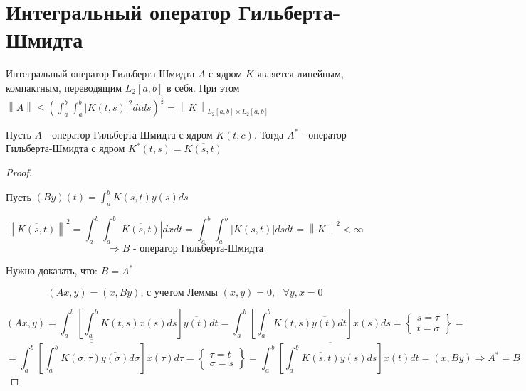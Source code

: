 \documentclass[12pt, a4paper]{report}
\begin{document}
\fi


\section{Интегральный оператор Гильберта-Шмидта}

\begin{theorem}

    Интегральный оператор Гильберта-Шмидта \( A \) с ядром \( K \) является линейным, компактным, переводящим \( L_2 [a,b] \) в себя. При этом \( \left\lVert A  \right\rVert \le  \displaystyle \left( \int_{a}^{b} \int_{a }^{b } \left\lvert K(t ,s )  \right\rvert ^2 dt ds  \right)^{\frac{1}{2}  } = \left\lVert K \right\rVert _{L_2 [a, b ]\times  L_2 [a,b]}   \) 

\end{theorem}

\begin{theorem}

    Пусть \( A  \) - оператор Гильберта-Шмидта с ядром \( K(t, c) \). Тогда \( A^* \) - оператор Гильберта-Шмидта с ядром \( K^* (t,s ) = \overline{K(s,t)}   \) 

\end{theorem}

\begin{proof} \(  \) 

    Пусть \( \displaystyle (By ) (t ) = \int_{a }^{b }  \overline{K(s,t)} y(s ) ds    \)  

    \[ \left\lVert \overline{K(s,t )}   \right\rVert ^2 = \int_{a }^{b }  \int_{a }^{b } \left\lvert \overline{ K (s, t )}   \right\rvert dx dt = \int_{a }^{b } \int_{a }^{b }  \left\lvert K (s,t ) \right\rvert ds dt  = \left\lVert K \right\rVert ^2 < \infty  \] 
    \[ \Rightarrow B \text{ - оператор Гильберта-Шмидта}  \] 

    Нужно доказать, что: \( B = A^* \) 

    \[ (Ax, y ) = (x, By ) \text{, с учетом Леммы } (x,y ) = 0 , \text{ }  \forall  y , x =0  \] 

    \[(A x , y ) = \int_{a }^{b }  \left[ \int_{a }^{b }  K (t, s ) x(s ) ds  \right] \overline{y (t )}  dt = \int_{a }^{b }  \left[ \int_{a }^{b }  K (t,s ) \overline{y (t )}  dt  \right] x (s ) ds = \left\{  \begin{aligned}
    s = \tau \\ 
    t = \sigma
    \end{aligned}\right\} = \] 
    \[ = \int_{a }^{b }  \overline{\overline{\left[ \int_{a }^{b }  K (\sigma , \tau ) \overline{y (\sigma )}  d \sigma  \right]}} x (\tau ) d \tau  = \left\{ \begin{aligned}
    \tau = t \\ 
    \sigma = s 
    \end{aligned} \right\}     = \int_{a }^{ b }  \overline{\left[  \int_{a }^{ b }  \overline{K (s, t )} y (s )  ds  \right]} x (t ) dt  = (x , B y ) \Rightarrow A ^* = B  \] 

\end{proof}
\end{document}

